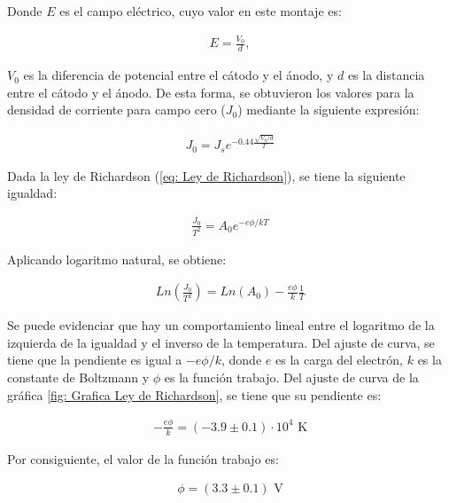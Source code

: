 \documentclass[%
 reprint,
 amsmath,amssymb,
 aps,
]{revtex4-2}
\begin{document}
\vspace{0.2 cm}
Donde $E$ es el campo eléctrico, cuyo valor en este montaje es:

\begin{align*}
    E = \frac{V_{0}}{d},
\end{align*}

\vspace{0.2 cm}
 $V_{0}$ es la diferencia de potencial entre el cátodo y el ánodo, y $d$ es la distancia entre el cátodo y el ánodo. De esta forma, se obtuvieron los valores para la densidad de corriente para campo cero ($J_{0}$) mediante la siguiente expresión:
 
\begin{align*}
    J_{0}= J_{s}e^{-0.44\frac{\sqrt{V_{0}/d}}{T}}
\end{align*}

\vspace{0.2 cm}
Dada la ley de Richardson (\ref{eq: Ley de Richardson}), se tiene la siguiente igualdad:

\begin{align*}
    \frac{J_{0}}{T^{2}} = A_{0}e^{-e\phi / kT}
\end{align*}

\vspace{0.2 cm}
Aplicando logaritmo natural, se obtiene:

\begin{align*}
    Ln \left( \frac{J_{0}}{T^{2}} \right) = Ln(A_{0}) - \frac{e\phi}{k}\frac{1}{T}
\end{align*}

\vspace{0.2 cm}
Se puede evidenciar que hay un comportamiento lineal entre el logaritmo de la izquierda de la igualdad y el inverso de la temperatura. Del ajuste de curva, se tiene que la pendiente es igual a $-e\phi/k$, donde $e$ es la carga del electrón, $k$ es la constante de Boltzmann y $\phi$ es la función trabajo. Del ajuste de curva de la gráfica \ref{fig: Grafica Ley de Richardson}, se tiene que su pendiente es:

\begin{align*}
    -\frac{e\phi}{k} = (-3.9 \pm 0.1) \cdot 10^4 \text{ K}
\end{align*}

\vspace{0.2 cm}
Por consiguiente, el valor de la función trabajo es:

\begin{align*}
    \phi = (3.3 \pm 0.1)\text{ V}
\end{align*}
\end{document}
